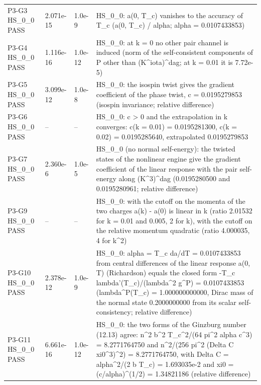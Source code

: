 \documentclass[aps,prd,onecolumn,superscriptaddress,nofootinbib,floatfix,longbibliography]{revtex4-2}
\begin{document}
\begin{longtable}{p{}p{}p{}p{}}
P3-G3 HS\_0\_0 \newline PASS & 2.071e-15 & 1.0e-9 & HS\_0\_0: a(0, T\_c) vanishes to the accuracy of T\_c (\textbar{}a(0, T\_c)\textbar{} / alpha; alpha = 0.0107433853) \\
P3-G4 HS\_0\_0 \newline PASS & 1.116e-16 & 1.0e-12 & HS\_0\_0: at k = 0 no other pair channel is induced (norm of the self-consistent components of P other than (K\textasciicircum{}iota)\textasciicircum{}dag; at k = 0.01 it is 7.72e-5) \\
P3-G5 HS\_0\_0 \newline PASS & 3.099e-12 & 1.0e-8 & HS\_0\_0: the isospin twist gives the gradient coefficient of the phase twist, c = 0.0195279853 (isospin invariance; relative difference) \\
P3-G6 HS\_0\_0 \newline PASS & -- & -- & HS\_0\_0: c \textgreater{} 0 and the extrapolation in k converges: c(k = 0.01) = 0.0195281300, c(k = 0.02) = 0.0195285640, extrapolated 0.0195279853 \\
P3-G7 HS\_0\_0 \newline PASS & 2.360e-6 & 1.0e-5 & HS\_0\_0 (no normal self-energy): the twisted states of the nonlinear engine give the gradient coefficient of the linear response with the pair self-energy along (K\textasciicircum{}3)\textasciicircum{}dag (0.0195280500 and 0.0195280961; relative difference) \\
P3-G9 HS\_0\_0 \newline PASS & -- & -- & HS\_0\_0: with the cutoff on the momenta of the two charges a(k) - a(0) is linear in \textbar{}k\textbar{} (ratio 2.01532 for k = 0.01 and 0.005, 2 for \textbar{}k\textbar{}), with the cutoff on the relative momentum quadratic (ratio 4.000035, 4 for k\textasciicircum{}2) \\
P3-G10 HS\_0\_0 \newline PASS & 2.378e-12 & 1.0e-9 & HS\_0\_0: alpha = T\_c da/dT = 0.0107433853 from central differences of the linear response a(0, T) (Richardson) equals the closed form -T\_c lambda'(T\_c)/(lambda\textasciicircum{}2 g\textasciicircum{}P) = 0.0107433853 (lambda\textasciicircum{}P(T\_c) = 1.000000000000, Dirac mass of the normal state 0.2000000000 from its scalar self-consistency; relative difference) \\
P3-G11 HS\_0\_0 \newline PASS & 6.661e-16 & 1.0e-12 & HS\_0\_0: the two forms of the Ginzburg number (12.13) agree: n\textasciicircum{}2 b\textasciicircum{}2 T\_c\textasciicircum{}2/(64 pi\textasciicircum{}2 alpha c\textasciicircum{}3) = 8.2771764750 and n\textasciicircum{}2/(256 pi\textasciicircum{}2 (Delta C xi0\textasciicircum{}3)\textasciicircum{}2) = 8.2771764750, with Delta C = alpha\textasciicircum{}2/(2 b T\_c) = 1.693035e-2 and xi0 = (c/alpha)\textasciicircum{}(1/2) = 1.34821186 (relative difference) \\

\end{longtable}
\end{document}
